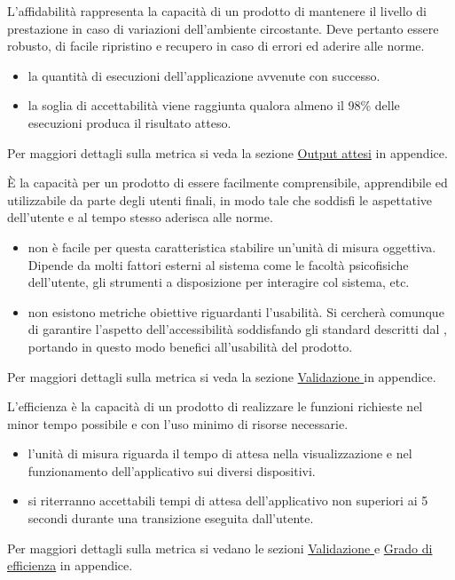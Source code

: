 \documentclass[a4paper, titlepage]{article}
\begin{document}
\newpage
{}
L'affidabilità rappresenta la capacità di un prodotto  di mantenere il livello di prestazione in caso di variazioni dell'ambiente circostante. Deve pertanto essere robusto, di facile ripristino e recupero in caso di errori ed aderire alle norme.
\begin{itemize}
\item {} la quantità di esecuzioni dell'applicazione avvenute con successo.
\item {} la soglia di accettabilità viene raggiunta qualora almeno il 98\% delle esecuzioni produca il risultato atteso.
\end{itemize}
Per maggiori dettagli sulla metrica si veda la sezione \hyperref[par:out]{Output attesi} in appendice.

È la capacità per un prodotto di essere facilmente comprensibile, apprendibile ed utilizzabile da parte degli utenti finali, in modo tale che soddisfi le aspettative dell'utente e al tempo stesso aderisca alle norme. 
\begin{itemize}
\item {} non è facile per questa caratteristica stabilire un'unità di misura oggettiva. Dipende da molti fattori esterni al sistema come le facoltà psicofisiche dell'utente, gli strumenti a disposizione per interagire col sistema, etc.
\item {} non esistono metriche obiettive riguardanti l’usabilità. Si cercherà comunque di garantire l'aspetto dell'accessibilità soddisfando gli standard  descritti dal , portando in questo modo benefici all'usabilità del prodotto.
\end{itemize}
Per maggiori dettagli sulla metrica si veda la sezione \hyperref[par:web]{Validazione } in appendice.

L'efficienza è la capacità di un prodotto  di realizzare le funzioni richieste nel minor tempo possibile e con l'uso minimo di risorse necessarie.
\begin{itemize}
\item {} l'unità di misura riguarda il tempo di attesa nella visualizzazione e nel funzionamento dell'applicativo sui diversi dispositivi.
\item {} si riterranno accettabili tempi di attesa dell'applicativo non superiori ai 5 secondi durante una transizione eseguita dall'utente.
\end{itemize}
Per maggiori dettagli sulla metrica si vedano le sezioni \hyperref[par:web]{Validazione } e \hyperref[par:greff]{Grado di efficienza} in appendice.
\end{document}
